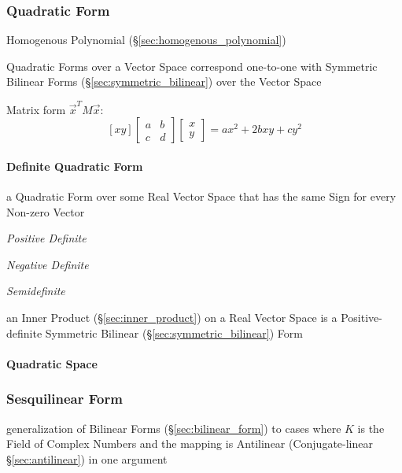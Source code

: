 \subsubsection{Quadratic Form}\label{sec:quadratic_form}


Homogenous Polynomial (\S\ref{sec:homogenous_polynomial})

Quadratic Forms over a Vector Space correspond one-to-one with
Symmetric Bilinear Forms (\S\ref{sec:symmetric_bilinear}) over
the Vector Space

Matrix form $\vec{x}^T M \vec{x}$:
\[
  [x y]
  \begin{bmatrix}
    a & b \\
    c & d
  \end{bmatrix}
  \begin{bmatrix}
    x \\
    y
  \end{bmatrix}
  = ax^2 + 2bxy + cy^2
\]



\paragraph{Definite Quadratic Form}\label{sec:definite_quadratic}\hfill

a Quadratic Form over some Real Vector Space that has the same Sign
for every Non-zero Vector

\emph{Positive Definite}

\emph{Negative Definite}

\emph{Semidefinite}

an Inner Product (\S\ref{sec:inner_product}) on a Real Vector Space is
a Positive-definite Symmetric Bilinear
(\S\ref{sec:symmetric_bilinear}) Form



\paragraph{Quadratic Space}\label{sec:quadratic_space}\hfill



\subsubsection{Sesquilinear Form}\label{sec:sesquilinear_form}

generalization of Bilinear Forms (\S\ref{sec:bilinear_form}) to cases where $K$
is the Field of Complex Numbers and the mapping is Antilinear (Conjugate-linear
\S\ref{sec:antilinear}) in one argument

